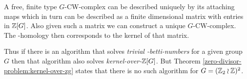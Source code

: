 	A free, finite type $G$-CW-complex can be described uniquely by its attaching maps which in turn can be described as a finite dimensional matrix with entries in $\mathbb{Z}[G]$. Also given such a matrix we can construct a unique $G$-CW-complex. The \ltwo-homology then corresponds to the kernel of that matrix.\footnotemark

	Thus if there is an algorithm that solves \emph{trivial \ltwo-betti-numbers} for a given group $G$ then that algorithm also solves \emph{kernel-over-$\mathbb{Z}[G]$}. But Theorem \ref{zero-divisor-problem:kernel-over-zg} states that there is no such algorithm for $G = (\mathbb{Z}_2 \wr \mathbb{Z})^2$.
\endproof

